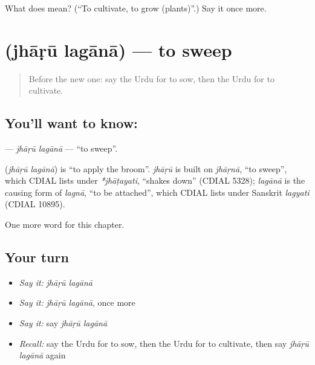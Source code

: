 \begin{tcolorbox}[breakable,colback=teal!4,colframe=teal!35!black,title={Before you move on}]
What does  mean? (\textquotedblleft{}To cultivate, to grow (plants)\textquotedblright{}.) Say it once more.
\end{tcolorbox}
\section[\texorpdfstring{\ur{جھاڑو} \ur{لگانا} (jhāṛū lagānā)}{جھاڑو لگانا (jhāṛū lagānā)}]{  (jhāṛū lagānā) — to sweep}

\label{lesson:UR-C241-jharu-lagana}



\begin{quote}
Before the new one: say the Urdu for to sow, then the Urdu for to cultivate.
\end{quote}

\subsection*{You'll want to know:  }
\textbf{ } — \emph{jhāṛū lagānā} — \textquotedblleft{}to sweep\textquotedblright{}.

\begin{cousinweb}
\textbf{ } (\emph{jhāṛū lagānā}) is \textquotedblleft{}to apply the broom\textquotedblright{}. \emph{jhāṛū} is built on \emph{jhāṛnā}, \textquotedblleft{}to sweep\textquotedblright{}, which CDIAL lists under \emph{*jhāṭayati}, \textquotedblleft{}shakes down\textquotedblright{} (CDIAL 5328); \emph{lagānā} is the causing form of \emph{lagnā}, \textquotedblleft{}to be attached\textquotedblright{}, which CDIAL lists under Sanskrit \emph{lagyati} (CDIAL 10895).
\end{cousinweb}

\begin{grammarlens}[title={What you've built}]
One more word for this chapter.
\end{grammarlens}

\subsection*{Your turn}
\begin{itemize}
\raggedright
  \item \emph{Say it:} \emph{jhāṛū lagānā}
  \item \emph{Say it:} \emph{jhāṛū lagānā}, once more
  \item \emph{Say it:} say \emph{jhāṛū lagānā}
  \item \emph{Recall:} say the Urdu for to sow, then the Urdu for to cultivate, then say \emph{jhāṛū lagānā} again
\end{itemize}

